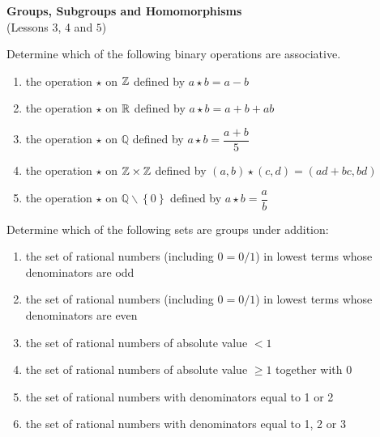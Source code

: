 \documentclass[
    11pt,a4paper,
]{exam}
\begin{document}
\def\contador{Problem Set 2}


\begin{center}
    {\bfseries\Large
        Groups, Subgroups and Homomorphisms}\\
    (Lessons 3, 4 and \(5\))
\end{center}


\begin{questions}
    \question Determine which of the following binary operations are associative.
    \begin{enumerate}[label=(\alph*)]
        \item the operation \(\star\) on \(\mathbb{Z}\) defined by \(a\star b  = a-b\)
        \item the operation \(\star\) on \(\mathbb{R}\) defined by \(a\star b  = a+b+ab\)
        \item the operation \(\star\) on \(\mathbb{Q}\) defined by \(a\star b  = \dfrac{a+b}{5}\)
        \item the operation \(\star\) on \(\mathbb{Z}\times\mathbb{Z}\) defined by \((a , b) \star (c,d)  = (ad+bc, bd)\)
        \item the operation \(\star\) on \(\mathbb{Q}\backslash\left\{ 0 \right\}\) defined by \(a\star b = \dfrac{a}{b} \)
    \end{enumerate}
    
    
    
    \question
    Determine which of the following sets are groups under addition:
    \begin{enumerate}[label=(\alph*)]
        \item the set of rational numbers (including \(0=0 / 1\)) in lowest terms whose denominators are odd
        \item the set of rational numbers (including \(0=0 / 1\)) in lowest terms whose denominators are even
        \item the set of rational numbers of absolute value \(<1\)
        \item the set of rational numbers of absolute value \(\geq 1\) together with 0
        \item the set of rational numbers with denominators equal to 1 or 2
        \item the set of rational numbers with denominators equal to 1, 2 or 3 
    \end{enumerate}
    
    
    

\end{questions}
\end{document}
